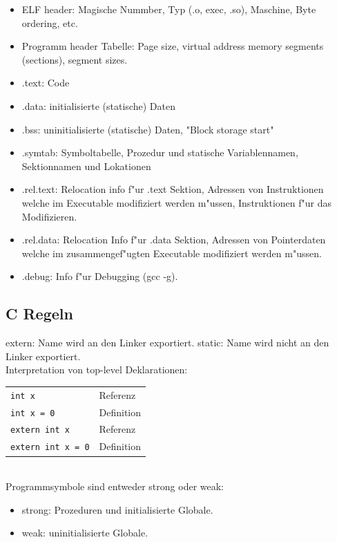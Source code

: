 \documentclass[german, 10pt, a4paper, twocolumn]{scrartcl}
\begin{document}
\begin{itemize}
	\item ELF header: Magische Nummber, Typ (.o, exec, .so), Maschine, Byte ordering, etc.
	\item Programm header Tabelle: Page size, virtual address memory segments (sections), segment sizes.
	\item .text: Code
	\item .data: initialisierte (statische) Daten
	\item .bss: uninitialisierte (statische) Daten, "Block storage start"
	\item .symtab: Symboltabelle, Prozedur und statische Variablennamen, Sektionnamen und Lokationen
	\item .rel.text: Relocation info f"ur .text Sektion, Adressen von Instruktionen welche im Executable modifiziert werden m"ussen, Instruktionen f"ur das Modifizieren.
	\item .rel.data: Relocation Info f"ur .data Sektion, Adressen von Pointerdaten welche im zusammengef"ugten Executable modifiziert werden m"ussen.
	\item .debug: Info f"ur Debugging (gcc -g).
\end{itemize}

\subsection{C Regeln}

extern: Name wird an den Linker exportiert.
static: Name wird nicht an den Linker exportiert.\\

Interpretation von top-level Deklarationen:\\

\begin{tabular}{ll}
	\verb#int x# &			Referenz\\
	\verb#int x = 0# &		Definition\\
	\verb#extern int x# &		Referenz\\
	\verb#extern int x = 0# &	Definition
\end{tabular}\\

Programmsymbole sind entweder strong oder weak:
\begin{itemize}
	\item strong: Prozeduren und initialisierte Globale.
	\item weak: uninitialisierte Globale.
\end{itemize}
\end{document}
